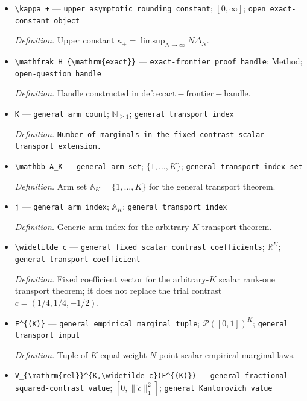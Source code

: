 \documentclass{article}
\begin{document}
\begin{itemize}
  \item \texttt{\textbackslash{}\allowbreak{}kappa\_\allowbreak{}+\allowbreak{}} --- \texttt{upper asymptotic rounding constant}; \([0,\infty]\); \texttt{open exact-\allowbreak{}constant object}
  \par\smallskip\noindent\emph{Definition.} Upper constant \(\kappa_+=\limsup_{N\to\infty}N\Delta_N\).
  \item \texttt{\textbackslash{}\allowbreak{}mathfrak H\_\allowbreak{}\{\textbackslash{}\allowbreak{}mathrm\{exact\}\allowbreak{}\}\allowbreak{}} --- \texttt{exact-\allowbreak{}frontier proof handle}; \(\mathrm{Method}\); \texttt{open-\allowbreak{}question handle}
  \par\smallskip\noindent\emph{Definition.} Handle constructed in \(\mathrm{def:exact-frontier-handle}\).
  \item \texttt{K} --- \texttt{general arm count}; \(\mathbb N_{\ge1}\); \texttt{general transport index}
  \par\smallskip\noindent\emph{Definition.} \texttt{Number of marginals in the fixed-\allowbreak{}contrast scalar transport extension.}
  \item \texttt{\textbackslash{}\allowbreak{}mathbb A\_\allowbreak{}K} --- \texttt{general arm set}; \(\{1,\ldots,K\}\); \texttt{general transport index set}
  \par\smallskip\noindent\emph{Definition.} Arm set \(\mathbb A_K=\{1,\ldots,K\}\) for the general transport theorem.
  \item \texttt{j} --- \texttt{general arm index}; \(\mathbb A_K\); \texttt{general transport index}
  \par\smallskip\noindent\emph{Definition.} Generic arm index for the arbitrary-\(K\) transport theorem.
  \item \texttt{\textbackslash{}\allowbreak{}widetilde c} --- \texttt{general fixed scalar contrast coefficients}; \(\mathbb R^K\); \texttt{general transport coefficient}
  \par\smallskip\noindent\emph{Definition.} Fixed coefficient vector for the arbitrary-\(K\) scalar rank-one transport theorem; it does not replace the trial contrast \(c=(1/4,1/4,-1/2)\).
  \item \texttt{F\textasciicircum{}\{(K)\}\allowbreak{}} --- \texttt{general empirical marginal tuple}; \(\mathcal P([0,1])^K\); \texttt{general transport input}
  \par\smallskip\noindent\emph{Definition.} Tuple of \(K\) equal-weight \(N\)-point scalar empirical marginal laws.
  \item \texttt{V\_\allowbreak{}\{\textbackslash{}\allowbreak{}mathrm\{rel\}\allowbreak{}\}\allowbreak{}\textasciicircum{}\{K,\allowbreak{}\textbackslash{}\allowbreak{}widetilde c\}\allowbreak{}(F\textasciicircum{}\{(K)\}\allowbreak{})} --- \texttt{general fractional squared-\allowbreak{}contrast value}; \([0,\|\widetilde c\|_1^2]\); \texttt{general Kantorovich value}

\end{itemize}
\end{document}
